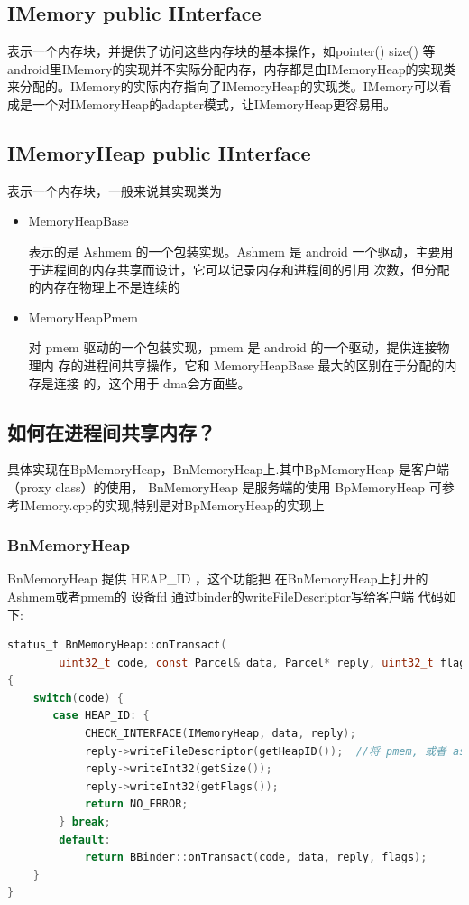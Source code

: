 \documentclass[a4paper,11pt]{article}
\begin{document}
\subsection{IMemory public IInterface}
表示一个内存块，并提供了访问这些内存块的基本操作，如pointer() size() 等
android里IMemory的实现并不实际分配内存，内存都是由IMemoryHeap的实现类来分配的。IMemory的实际内存指向了IMemoryHeap的实现类。IMemory可以看成是一个对IMemoryHeap的adapter模式，让IMemoryHeap更容易用。

\subsection{IMemoryHeap public IInterface}
表示一个内存块，一般来说其实现类为
\begin{itemize}
    \item MemoryHeapBase 

        表示的是 Ashmem 的一个包装实现。Ashmem 是 android
        一个驱动，主要用于进程间的内存共享而设计，它可以记录内存和进程间的引用
        次数，但分配的内存在物理上不是连续的

    \item MemoryHeapPmem  

        对 pmem 驱动的一个包装实现，pmem 是 android 的一个驱动，提供连接物理内
        存的进程间共享操作，它和 MemoryHeapBase 最大的区别在于分配的内存是连接
        的，这个用于 dma会方面些。
\end{itemize}
 
\subsection{ 如何在进程间共享内存？}
   具体实现在BpMemoryHeap，BnMemoryHeap上.其中BpMemoryHeap 是客户端（proxy class）的使用，
 BnMemoryHeap 是服务端的使用
  BpMemoryHeap
可参考IMemory.cpp的实现,特别是对BpMemoryHeap的实现上

\subsubsection{BnMemoryHeap}
  BnMemoryHeap  提供  HEAP_ID ，这个功能把 在BnMemoryHeap上打开的 Ashmem或者pmem的 设备fd 通过binder的writeFileDescriptor写给客户端
代码如下:
\begin{lstlisting}[language=c]
status_t BnMemoryHeap::onTransact(
        uint32_t code, const Parcel& data, Parcel* reply, uint32_t flags)
{
    switch(code) {
       case HEAP_ID: {
            CHECK_INTERFACE(IMemoryHeap, data, reply);
            reply->writeFileDescriptor(getHeapID());  //将 pmem, 或者 ashmem 的 fd 写给客户端
            reply->writeInt32(getSize());
            reply->writeInt32(getFlags());
            return NO_ERROR;
        } break;
        default:
            return BBinder::onTransact(code, data, reply, flags);
    }
}
\end{lstlisting}
 
\end{document}
